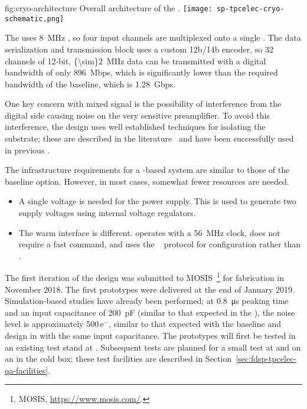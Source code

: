 \begin{dunefigure}
{fig:cryo-architecture}
{Overall architecture of the  .}
\texttt{[image: sp-tpcelec-cryo-schematic.png]}
\end{dunefigure}

The  uses \SI{8}{MHz} , so four input channels are 
multiplexed onto a single . The data serialization and transmission 
block uses a custom 12b/14b encoder, so \num{32} channels of \num{12}-bit, 
\SI{{\sim}2}{MHz} data can be transmitted with a digital bandwidth of 
only \SI{896}{Mbps}, which is significantly lower %
than the required bandwidth 
of the baseline, which is \SI{1.28}{Gbps}.

One key concern with mixed signal  is the possibility of 
interference from the digital side causing noise on the very sensitive 
preamplifier. To avoid this interference, the  design 
uses well established techniques for isolating the substrate; these are 
described in the literature~\cite{yeh} and %
have been successfully 
used in previous .

The infrastructure requirements for a  -based 
system are similar to those of the baseline option. However, in most 
cases, somewhat fewer resources are needed.
\begin{itemize}
\item{A single voltage is needed for the power supply. This is used to 
generate two supply voltages using internal voltage regulators.}
\item{The warm interface is different.  operates with
a \SI{56}{MHz} clock, does not require a fast command, and uses
the ~\cite{SACI} protocol for configuration rather than .}
\end{itemize}

The first iteration of the   design was 
submitted to MOSIS~\footnote{MOSIS\texttrademark{}, \url{https://www.mosis.com/}.} for fabrication in November 2018.  
The first prototypes were delivered at the end of January 2019. Simulation-based 
studies have already been performed; at \SI{0.8}{\micro\second} peaking 
time and an input capacitance of \SI{200}{pF} (similar to that expected 
in the ), the noise level is approximately 
\num{500}\,e$^-$, similar to that expected with the 
baseline  and   design in  
with the same input capacitance.  The prototypes will first be tested in an existing 
test stand at . Subsequent tests are planned for a small test 
 at  and on an  in the  
cold box; these test facilities are described in 
Section~\ref{sec:fdsp-tpcelec-qa-facilities}.

